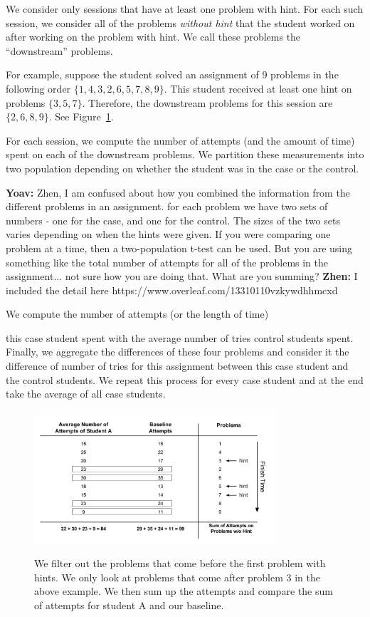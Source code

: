 \documentclass{llncs}
\begin{document}
We consider only sessions that have at least one problem with
hint. For each such session, we consider all of the problems {\em
  without hint} that the student worked on after working on the
problem with hint. We call these problems the ``downstream'' problems.

For example, suppose the student solved an assignment of 9 problems in the
following order $\{ 1, 4, 3, 2, 6, 5, 7, 8, 9\}$. This student
received at least one hint on problems $\{3, 5, 7\}$. Therefore, the
downstream problems for this session are $\{2, 6, 8, 9\}$. See
Figure~\ref{fig:pro_no_hint}.

For each session, we compute the number of attempts (and the amount of
time) spent on each of the downstream problems. We partition these
measurements into two population depending on whether the student was
in the case or the control.

{\bf Yoav:} Zhen, I am confused about how you combined the information
from the different problems in an assignment. for each problem we have
two sets of numbers - one for the case, and one for the control. The
sizes of the two sets varies depending on when the hints were
given. If you were comparing one problem at a time, then a
two-population t-test can be used. But you are using something like
the total number of attempts for all of the problems in the
assignment... not sure how you are doing that. What are you summing?
{\bf Zhen:} I included the detail here https://www.overleaf.com/13310110vzkywdhhmcxd

We compute the number of attempts (or the length of time)

this case student spent with the
average number of tries control students spent. Finally, we aggregate
the differences of these four problems and consider it the difference
of number of tries for this assignment between this case student and
the control students. We repeat this process for every case student
and at the end take the average of all case students.

\begin{figure}[ht]
   \centering
   \caption{We filter out the problems that come before the first problem with hints. We only look at problems that come after problem 3 in the above example. We then sum up the attempts and compare the sum of attempts for student A and our baseline.}
   \includegraphics[width=0.8\textwidth]{image/Filter_problems.png}
   \label{fig:pro_no_hint}
\end{figure}
\end{document}
